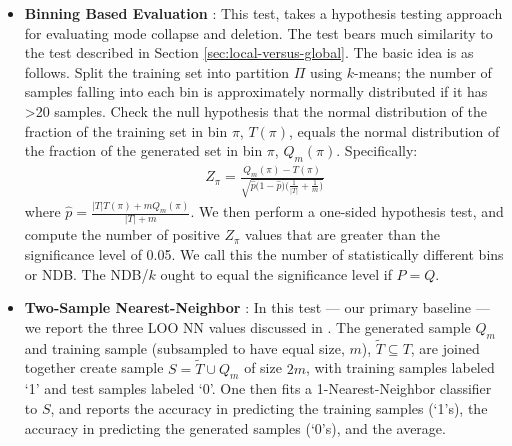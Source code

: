 \begin{itemize}
    \item \textbf{Binning Based Evaluation} \citep{richardson}: This test, takes a hypothesis testing approach for evaluating mode collapse and deletion. The test bears much similarity to the test described in Section \ref{sec:local-versus-global}. The basic idea is as follows. Split the training set into partition $\Pi$ using $k$-means; the number of samples falling into each bin is approximately normally distributed if it has >20 samples. Check the null hypothesis that the normal distribution of the fraction of the training set in bin $\pi$, $T(\pi)$, equals the normal distribution of the fraction of the generated set in bin $\pi$, $Q_m(\pi)$. Specifically: 
    \begin{align*}
        Z_\pi = \frac{Q_m(\pi) - T(\pi)}
         {\sqrt{ \widehat{p}\big(1 - \widehat{p}\big) \big( \frac{1}{|T|} + \frac{1}{m} \big) }}
    \end{align*}
    where $\widehat{p} = \frac{|T|T(\pi) + mQ_m(\pi)}{|T| + m}$. We then perform a one-sided hypothesis test, and compute the number of positive $Z_\pi$ values that are greater than the significance level of 0.05. We call this the number of statistically different bins or NDB. The NDB/$k$ ought to equal the significance level if $P = Q$. 
    \item \textbf{Two-Sample Nearest-Neighbor} \citep{lopez}: In this test --- our primary baseline --- we report the three LOO NN values discussed in \cite{Kilian}. The generated sample $Q_m$ and training sample (subsampled to have equal size, $m$), $\widetilde{T} \subseteq T$, are joined together create sample $S = \widetilde{T} \cup Q_m$ of size $2m$, with training samples labeled `1' and test samples labeled `0'. One then fits a 1-Nearest-Neighbor classifier to $S$, and reports the accuracy in predicting the training samples (`1's), the accuracy in predicting the generated samples (`0's), and the average. 
    

\end{itemize}
